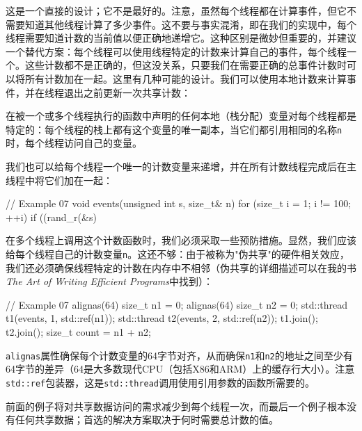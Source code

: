 这是一个直接的设计；它不是最好的。注意，虽然每个线程都在计算事件，但它不需要知道其他线程计算了多少事件。这不要与事实混淆，即在我们的实现中，每个线程需要知道计数的当前值以便正确地递增它。这种区别是微妙但重要的，并建议一个替代方案：每个线程可以使用线程特定的计数来计算自己的事件，每个线程一个。这些计数都不是正确的，但这没关系，只要我们在需要正确的总事件计数时可以将所有计数加在一起。这里有几种可能的设计。我们可以使用本地计数来计算事件，并在线程退出之前更新一次共享计数：


在被一个或多个线程执行的函数中声明的任何本地（栈分配）变量对每个线程都是特定的：每个线程的栈上都有这个变量的唯一副本，当它们都引用相同的名称\texttt{n}时，每个线程访问自己的变量。

我们也可以给每个线程一个唯一的计数变量来递增，并在所有计数线程完成后在主线程中将它们加在一起：

\begin{code}
// Example 07
void events(unsigned int s, size_t& n) {
  for (size_t i = 1; i != 100; ++i) {
    if ((rand_r(&s) %
  }
}
\end{code}

在多个线程上调用这个计数函数时，我们必须采取一些预防措施。显然，我们应该给每个线程自己的计数变量\texttt{n}。这还不够：由于被称为"伪共享"的硬件相关效应，我们还必须确保线程特定的计数在内存中不相邻（伪共享的详细描述可以在我的书\emph{The Art of Writing} \emph{Efficient Programs}中找到）：

\begin{code}
// Example 07
alignas(64) size_t n1 = 0;
alignas(64) size_t n2 = 0;
std::thread t1(events, 1, std::ref(n1));
std::thread t2(events, 2, std::ref(n2));
t1.join();
t2.join();
size_t count = n1 + n2;
\end{code}

\texttt{alignas}属性确保每个计数变量的64字节对齐，从而确保\texttt{n1}和\texttt{n2}的地址之间至少有64字节的差异（64是大多数现代CPU（包括X86和ARM）上的缓存行大小）。注意\texttt{std::ref}包装器，这是\texttt{std::thread}调用使用引用参数的函数所需要的。

前面的例子将对共享数据访问的需求减少到每个线程一次，而最后一个例子根本没有任何共享数据；首选的解决方案取决于何时需要总计数的值。

